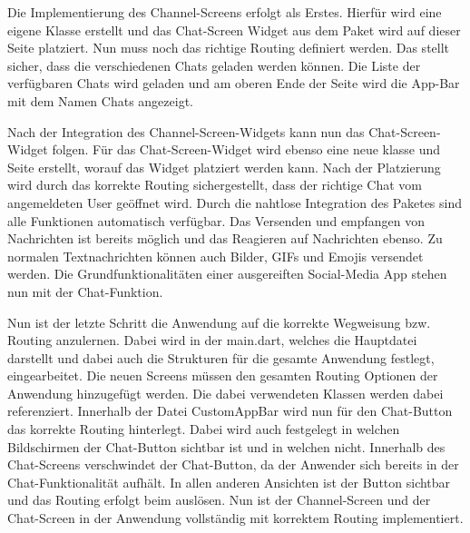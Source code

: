 \noindent
Die Implementierung des Channel-Screens erfolgt als Erstes. Hierfür wird eine eigene Klasse erstellt und das Chat-Screen Widget aus dem Paket wird auf dieser Seite platziert. Nun muss noch das richtige Routing definiert werden. Das stellt sicher, dass die verschiedenen Chats geladen werden können. Die Liste der verfügbaren Chats wird geladen und am oberen Ende der Seite wird die App-Bar mit dem Namen Chats angezeigt.

\noindent
Nach der Integration des Channel-Screen-Widgets kann nun das Chat-Screen-Widget folgen. Für das Chat-Screen-Widget wird ebenso eine neue klasse und Seite erstellt, worauf das Widget platziert werden kann. Nach der Platzierung wird durch das korrekte Routing sichergestellt, dass der richtige Chat vom angemeldeten User geöffnet wird. Durch die nahtlose Integration des Paketes sind alle Funktionen automatisch verfügbar. Das Versenden und empfangen von Nachrichten ist bereits möglich und das Reagieren auf Nachrichten ebenso. Zu normalen Textnachrichten können auch Bilder, GIFs und Emojis versendet werden. Die Grundfunktionalitäten einer ausgereiften Social-Media App stehen nun mit der Chat-Funktion.

\noindent
Nun ist der letzte Schritt die Anwendung auf die korrekte Wegweisung bzw. Routing anzulernen. Dabei wird in der main.dart, welches die Hauptdatei darstellt und dabei auch die Strukturen für die gesamte Anwendung festlegt, eingearbeitet. Die neuen Screens müssen den gesamten Routing Optionen der Anwendung hinzugefügt werden. Die dabei verwendeten Klassen werden dabei referenziert. Innerhalb der Datei CustomAppBar wird nun für den Chat-Button das korrekte Routing hinterlegt. Dabei wird auch festgelegt in welchen Bildschirmen der Chat-Button sichtbar ist und in welchen nicht. Innerhalb des Chat-Screens verschwindet der Chat-Button, da der Anwender sich bereits in der Chat-Funktionalität aufhält. In allen anderen Ansichten ist der Button sichtbar und das Routing erfolgt beim auslösen. Nun ist der Channel-Screen und der Chat-Screen in der Anwendung vollständig mit korrektem Routing implementiert.